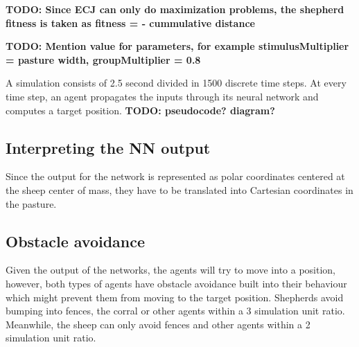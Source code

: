 \documentclass[conference]{IEEEtran}
\begin{document}
\textbf{TODO: Since ECJ can only do maximization problems, the shepherd fitness is taken as 
fitness = - cummulative distance}

\textbf{TODO: Mention value for parameters, for example stimulusMultiplier = pasture width, groupMultiplier = 0.8}

A simulation consists of 2.5 second divided in 1500 discrete time steps. At every time step, an agent propagates the inputs through its neural network and computes a target position.
\textbf{TODO: pseudocode? diagram?}
 

\subsection{Interpreting the NN output}
Since the output for the network is represented as polar coordinates centered at the sheep center of mass, they have to be translated into Cartesian coordinates in the pasture. 

\subsection{Obstacle avoidance}
Given the output of the networks, the agents will try to move into a position, however, both types of agents have obstacle avoidance built into their behaviour which might prevent them from moving to the target position. Shepherds avoid bumping into fences, the corral or other agents within a 3 simulation unit ratio. Meanwhile, the sheep can only avoid fences and other agents within a 2 simulation unit ratio. 
\end{document}
